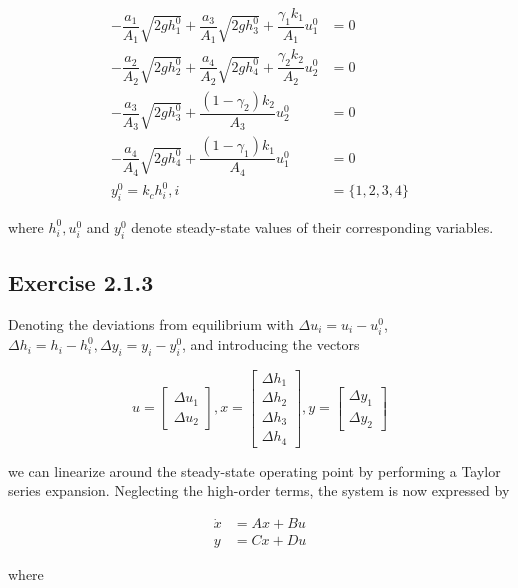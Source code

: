 \begin{align*}
  -\dfrac{a_1}{A_1}\sqrt{2gh_1^0} + \dfrac{a_3}{A_1}\sqrt{2gh_3^0} + \dfrac{\gamma_1 k_1}{A_1}u_1^0 &= 0\\
  -\dfrac{a_2}{A_2}\sqrt{2gh_2^0} + \dfrac{a_4}{A_2}\sqrt{2gh_4^0} + \dfrac{\gamma_2 k_2}{A_2}u_2^0 &= 0\\
  -\dfrac{a_3}{A_3}\sqrt{2gh_3^0} + \dfrac{(1-\gamma_2)k_2}{A_3}u_2^0 &= 0\\
  -\dfrac{a_4}{A_4}\sqrt{2gh_4^0} + \dfrac{(1-\gamma_1)k_1}{A_4}u_1^0 &= 0\\
  y_i^0 = k_c h_i^0, i &= \{1,2,3,4\}
\end{align*}

where $h_i^0, u_i^0$ and $y_i^0$ denote steady-state values of their
corresponding variables.



\subsection*{Exercise 2.1.3}

Denoting the deviations from equilibrium with $\Delta u_i = u_i - u_i^0$,
$\Delta h_i = h_i - h_i^0, \Delta y_i = y_i - y_i^0$, and introducing the
vectors

\[
u=
\begin{bmatrix}
  \Delta u_1  \\
  \Delta u_2
\end{bmatrix},
x =
\begin{bmatrix}
\Delta h_1 \\
\Delta h_2 \\
\Delta h_3 \\
\Delta h_4
\end{bmatrix},
y =
\begin{bmatrix}
  \Delta y_1  \\
  \Delta y_2
\end{bmatrix}
\]

we can linearize around the steady-state operating point by performing a Taylor
series expansion. Neglecting the high-order terms, the system is now expressed by

\begin{align*}
  \dot{x} &= Ax + Bu  \\
   y &= Cx + Du
\end{align*}

where

